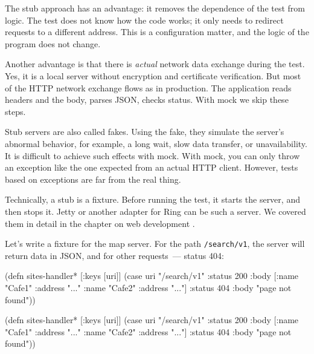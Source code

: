 The stub approach has an advantage: it removes the dependence of the test from logic. The test does not know how the code works; it only needs to redirect requests to a different address. This is a configuration matter, and the logic of the program does not change.

Another advantage is that there is \emph{actual} network data exchange during the test. Yes, it is a local server without encryption and certificate verification. But most of the HTTP network exchange flows as in production. The application reads headers and the body, parses JSON, checks status. With mock we skip these steps.


Stub servers are also called fakes. Using the fake, they simulate the server's abnormal behavior, for example, a long wait, slow data transfer, or unavailability. It is difficult to achieve such effects with mock. With mock, you can only throw an exception like the one expected from an actual HTTP client. However, tests based on exceptions are far from the real thing.

Technically, a stub is a fixture. Before running the test, it starts the server, and then stops it. Jetty or another adapter for Ring can be such a server. We covered them in detail in the chapter on web development .

Let's write a fixture for the map server. For the path \verb|/search/v1|, the server will return data in JSON, and for other requests~--- status 404:

\label{sites-handler}

\ifnarrow

\begin{english}
  \begin{clojure}
(defn sites-handler* [{:keys [uri]}]
  (case uri
    "/search/v1"
    {:status 200
     :body [{:name "Cafe1"
             :address "..."}
            {:name "Cafe2"
             :address "..."}]}
    {:status 404
     :body "page not found"}))
  \end{clojure}
\end{english}

\else

\begin{english}
  \begin{clojure}
(defn sites-handler* [{:keys [uri]}]
  (case uri
    "/search/v1"
    {:status 200 :body [{:name "Cafe1" :address "..."}
                        {:name "Cafe2" :address "..."}]}
    {:status 404 :body "page not found"}))
  \end{clojure}
\end{english}

